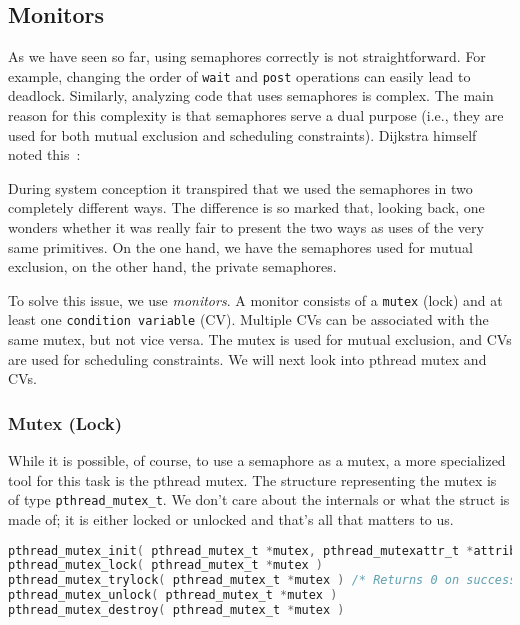 




\subsection*{Monitors}
As we have seen so far, using semaphores correctly is not straightforward.
For example, changing the order of \texttt{wait} and \texttt{post} operations can easily lead to deadlock.
Similarly, analyzing code that uses semaphores is complex.
The main reason for this complexity is that semaphores serve a dual purpose (i.e., they are used for both mutual exclusion and scheduling constraints).
Dijkstra himself noted this~\cite{semaphores}:
\begin{displayquote}
    During system conception it transpired that we used the semaphores in two completely different ways.
    The difference is so marked that, looking back, one wonders whether it was really fair to present the two ways as uses of the very same primitives.
    On the one hand, we have the semaphores used for mutual exclusion, on the other hand, the private semaphores.
\end{displayquote}

To solve this issue, we use \emph{monitors}.
A monitor consists of a \texttt{mutex} (lock) and at least one \texttt{condition variable} (CV).
Multiple CVs can be associated with the same mutex, but not vice versa.
The mutex is used for mutual exclusion, and CVs are used for scheduling constraints.
We will next look into pthread mutex and CVs.

\subsubsection*{Mutex (Lock)}
While it is possible, of course, to use a semaphore as a mutex, a more specialized tool for this task is the pthread mutex.
The structure representing the mutex is of type \texttt{pthread\_mutex\_t}. We don't care about the internals or what the struct is made of; it is either locked or unlocked and that's all that matters to us.

\begin{lstlisting}[language=C]
pthread_mutex_init( pthread_mutex_t *mutex, pthread_mutexattr_t *attributes )
pthread_mutex_lock( pthread_mutex_t *mutex )
pthread_mutex_trylock( pthread_mutex_t *mutex ) /* Returns 0 on success */
pthread_mutex_unlock( pthread_mutex_t *mutex )
pthread_mutex_destroy( pthread_mutex_t *mutex )
\end{lstlisting}

